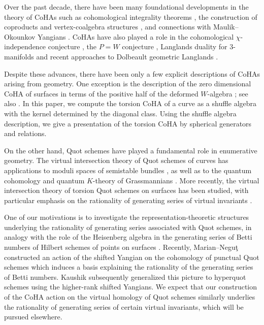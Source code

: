 \documentclass[10pt]{amsart}
\newcommand{\+}{{}^+}
\theoremstyle{definition}
\theoremstyle {definition}
\theoremstyle {definition}
\begin{document}
Over the past decade, there have been many foundational developments in the theory of CoHAs such as cohomological integrality theorems \cite{efimov,Davison_Meinhardt,Henncartint, BDNKP,hennecart2025bpsdecompositiontheorem}, the construction of coproducts and vertex-coalgebra structures \cite{davison2016criticalcohaquiverpotential,jindal2026criticalcohasvertexcoalgebras,  DHKSV}, and connections with Maulik--Okounkov Yangians \cite{MaulikOkounkov, BD, SV_Yangian}. CoHAs have also played a role in the cohomological $\chi$-independence conjecture \cite{DHKSV}, the $P=W$ conjecture \cite{hausel2025pwmathcalh2}, Langlands duality for 3-manifolds \cite{Kinjo-Park-Safronov} and recent approaches to Dolbeault geometric Langlands \cite{pădurariu2026dolbeaultgeometriclanglandsconjecture}. 

Despite these advances, there have been only a few explicit descriptions of CoHAs arising from geometry. One exception is the description of the zero dimensional CoHA of surfaces in terms of the positive half of the deformed $W$-algebra \cite{N1,MMSV}; see also \cite{arbesfeldschiffmann, Sala-Schiffmann,DPS,  Jindal, davisonaffinebps, DPSSV, sala2025kleinianorbifoldscohomologicalhall}. In this paper, we compute the torsion CoHA of a curve as a shuffle algebra with the kernel determined by the diagonal class. Using the shuffle algebra description, we give a presentation of the torsion CoHA by spherical generators and relations. 


On the other hand, Quot schemes have played a fundamental role in enumerative geometry. The virtual intersection theory of Quot schemes of curves has applications to moduli spaces of semistable bundles \cite{MO1, M1, M2}, as well as to the quantum cohomology and quantum $K$-theory of Grassmannians \cite{Bertram, BDW, MO2, SZ1, SZ2}. More recently, the virtual intersection theory of torsion Quot schemes on surfaces has been studied, with particular emphasis on the rationality of generating series of virtual invariants \cite{OP, JOP, AJLOP, Anderson}.


One of our motivations is to investigate the representation-theoretic structures underlying the rationality of generating series associated with Quot schemes, in analogy with the role of the Heisenberg algebra \cite{Nakajima, Grojnowski} in the generating series of Betti numbers of Hilbert schemes of points on surfaces \cite{Gottsche}. Recently, Marian--Negu\c t \cite{marian2026cohomologyquotschemesmooth} constructed an action of the shifted Yangian on the cohomology of punctual Quot schemes which induces a basis explaining the rationality of the generating series of Betti numbers. Kaushik \cite{kaushik} subsequently generalized this picture to hyperquot schemes using the higher-rank shifted Yangians. We expect that our construction of the CoHA action on the virtual homology of Quot schemes similarly underlies the rationality of generating series of certain virtual invariants, which will be pursued elsewhere.
\end{document}
